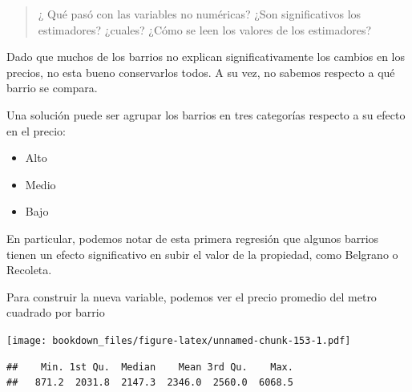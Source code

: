 \documentclass[]{book}
\newenvironment{Shaded}{\begin{snugshade}}{\end{snugshade}}
\newcommand{\DataTypeTok}[1]{\textcolor[rgb]{0.13,0.29,0.53}{#1}}
\newcommand{\KeywordTok}[1]{\textcolor[rgb]{0.13,0.29,0.53}{\textbf{#1}}}
\newcommand{\NormalTok}[1]{#1}
\newcommand{\OperatorTok}[1]{\textcolor[rgb]{0.81,0.36,0.00}{\textbf{#1}}}
\newcommand{\StringTok}[1]{\textcolor[rgb]{0.31,0.60,0.02}{#1}}
\providecommand{\tightlist}{%
  \setlength{\itemsep}{0pt}\setlength{\parskip}{0pt}}
\begin{document}
\begin{quote}
¿ Qué pasó con las variables no numéricas?
¿Son significativos los estimadores? ¿cuales?
¿Cómo se leen los valores de los estimadores?
\end{quote}

Dado que muchos de los barrios no explican significativamente los cambios en los precios, no esta bueno conservarlos todos. A su vez, no sabemos respecto a qué barrio se compara.

Una solución puede ser agrupar los barrios en tres categorías respecto a su efecto en el precio:

\begin{itemize}
\tightlist
\item
  Alto
\item
  Medio
\item
  Bajo
\end{itemize}

En particular, podemos notar de esta primera regresión que algunos barrios tienen un efecto significativo en subir el valor de la propiedad, como Belgrano o Recoleta.

Para construir la nueva variable, podemos ver el precio promedio del metro cuadrado por barrio

\begin{Shaded}
\end{Shaded}

\texttt{[image: bookdown\_files/figure-latex/unnamed-chunk-153-1.pdf]}

\begin{Shaded}
\end{Shaded}

\begin{verbatim}
##    Min. 1st Qu.  Median    Mean 3rd Qu.    Max. 
##   871.2  2031.8  2147.3  2346.0  2560.0  6068.5
\end{verbatim}
\end{document}
